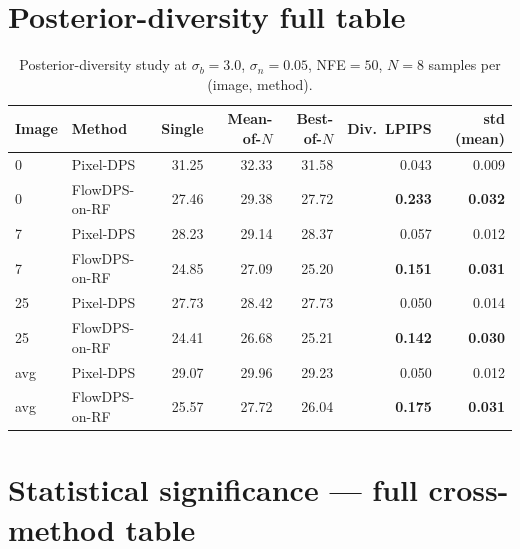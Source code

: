 \documentclass{article}
\begin{document}
\section{Posterior-diversity full table}
\label{app:diversity}

\begin{table}[h]
  \centering
  \caption{Posterior-diversity study at $\sigma_b{=}3.0$,
    $\sigma_n{=}0.05$, NFE${=}50$, $N{=}8$ samples per (image, method).}
  \label{tab:diversity_full}
  \begin{tabular}{llrrrrr}
    \toprule
    Image & Method & Single & Mean-of-$N$ & Best-of-$N$ & Div.\ LPIPS & std (mean) \\
    \midrule
    0  & Pixel-DPS     & 31.25 & 32.33 & 31.58 & 0.043 & 0.009 \\
    0  & FlowDPS-on-RF & 27.46 & 29.38 & 27.72 & \textbf{0.233} & \textbf{0.032} \\
    7  & Pixel-DPS     & 28.23 & 29.14 & 28.37 & 0.057 & 0.012 \\
    7  & FlowDPS-on-RF & 24.85 & 27.09 & 25.20 & \textbf{0.151} & \textbf{0.031} \\
    25 & Pixel-DPS     & 27.73 & 28.42 & 27.73 & 0.050 & 0.014 \\
    25 & FlowDPS-on-RF & 24.41 & 26.68 & 25.21 & \textbf{0.142} & \textbf{0.030} \\
    \midrule
    avg & Pixel-DPS     & 29.07 & 29.96 & 29.23 & 0.050 & 0.012 \\
    avg & FlowDPS-on-RF & 25.57 & 27.72 & 26.04 & \textbf{0.175} & \textbf{0.031} \\
    \bottomrule
  \end{tabular}
\end{table}

\section{Statistical significance — full cross-method table}
\label{app:significance}
\end{document}
